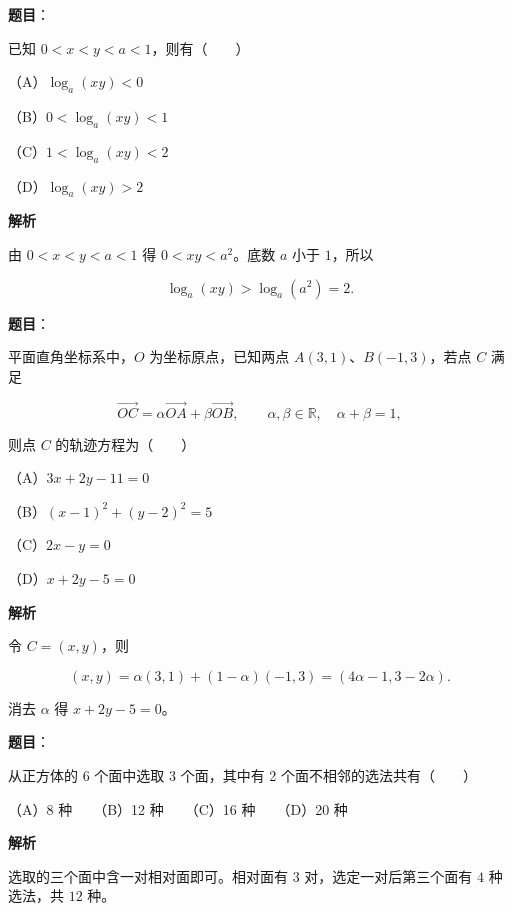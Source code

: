 \begin{answer}

\textbf{题目}：

已知 $0<x<y<a<1$，则有\mbox{（　　）}

（A）$\log_a(xy)<0$

（B）$0<\log_a(xy)<1$

（C）$1<\log_a(xy)<2$

（D）$\log_a(xy)>2$

\textbf{解析}

由 $0<x<y<a<1$ 得 $0<xy<a^2$。底数 $a$ 小于 $1$，所以

\nopagebreak[4]
\[
\log_a(xy)>\log_a(a^2)=2.
\]


\end{answer}
\begin{answer}

\textbf{题目}：

平面直角坐标系中，$O$ 为坐标原点，已知两点 $A(3,1)\text{、}B(-1,3)$，若点 $C$ 满足

\nopagebreak[4]
\[
\overrightarrow{OC}=\alpha\overrightarrow{OA}+\beta\overrightarrow{OB},
\qquad \alpha,\beta\in\mathbb R,\quad \alpha+\beta=1,
\]

则点 $C$ 的轨迹方程为\mbox{（　　）}

（A）$3x+2y-11=0$

（B）$(x-1)^2+(y-2)^2=5$

（C）$2x-y=0$

（D）$x+2y-5=0$

\textbf{解析}

令 $C=(x,y)$，则

\nopagebreak[4]
\[
(x,y)=\alpha(3,1)+(1-\alpha)(-1,3)
=(4\alpha-1,3-2\alpha).
\]

消去 $\alpha$ 得 $x+2y-5=0$。


\end{answer}
\begin{answer}

\textbf{题目}：

从正方体的 6 个面中选取 3 个面，其中有 2 个面不相邻的选法共有\mbox{（　　）}

（A）8 种　　（B）12 种　　（C）16 种　　（D）20 种

\textbf{解析}

选取的三个面中含一对相对面即可。相对面有 $3$ 对，选定一对后第三个面有 $4$ 种选法，共 $12$ 种。


\end{answer}
